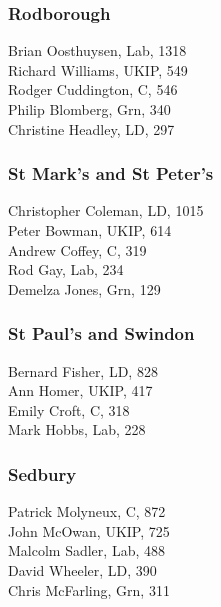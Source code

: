 \documentclass[a4paper,openany,10pt]{book}
\begin{document}
\subsubsection*{Rodborough}



Brian Oosthuysen, Lab, 1318\\
Richard Williams, UKIP, 549\\
Rodger Cuddington, C, 546\\
Philip Blomberg, Grn, 340\\
Christine Headley, LD, 297\\


\subsubsection*{St Mark's and St Peter's}



Christopher Coleman, LD, 1015\\
Peter Bowman, UKIP, 614\\
Andrew Coffey, C, 319\\
Rod Gay, Lab, 234\\
Demelza Jones, Grn, 129\\


\subsubsection*{St Paul's and Swindon}



Bernard Fisher, LD, 828\\
Ann Homer, UKIP, 417\\
Emily Croft, C, 318\\
Mark Hobbs, Lab, 228\\


\subsubsection*{Sedbury}



Patrick Molyneux, C, 872\\
John McOwan, UKIP, 725\\
Malcolm Sadler, Lab, 488\\
David Wheeler, LD, 390\\
Chris McFarling, Grn, 311\\
\end{document}
